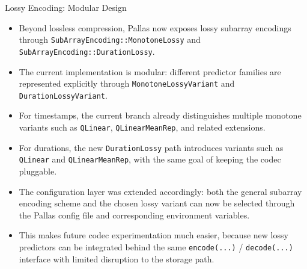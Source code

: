 \documentclass[10pt,aspectratio=169]{beamer}
\begin{document}
\begin{frame}{Lossy Encoding: Modular Design}
  \small
  \begin{itemize}
    \item<1-> Beyond lossless compression, Pallas now exposes lossy subarray encodings through \texttt{SubArrayEncoding::MonotoneLossy} and \texttt{SubArrayEncoding::DurationLossy}.
    \item<2-> The current implementation is modular: different predictor families are represented explicitly through \texttt{MonotoneLossyVariant} and \texttt{DurationLossyVariant}.
    \item<3-> For timestamps, the current branch already distinguishes multiple monotone variants such as \texttt{QLinear}, \texttt{QLinearMeanRep}, and related extensions.
    \item<4-> For durations, the new \texttt{DurationLossy} path introduces variants such as \texttt{QLinear} and \texttt{QLinearMeanRep}, with the same goal of keeping the codec pluggable.
    \item<5-> The configuration layer was extended accordingly: both the general subarray encoding scheme and the chosen lossy variant can now be selected through the Pallas config file and corresponding environment variables.
    \item<6-> This makes future codec experimentation much easier, because new lossy predictors can be integrated behind the same \texttt{encode(...)} / \texttt{decode(...)} interface with limited disruption to the storage path.
  \end{itemize}
\end{frame}
\end{document}
